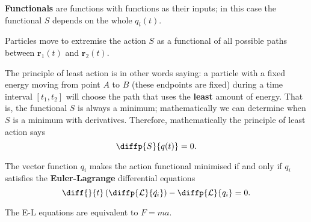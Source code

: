 \documentclass[12pt, a4paper]{article}
\begin{document}
\begin{mdnote}
    \textbf{Functionals} are functions with functions as their inputs; in this case the functional \(S\) depends on the whole \(q_i(t)\).
\end{mdnote}

\begin{mdthm}
    Particles move to extremise the action \(S\) as a functional of all possible paths between \(\bm{r}_1(t)\) and \(\bm{r}_2(t)\).
\end{mdthm}

\begin{mdnote}
    The principle of least action is in other words saying: a particle with a fixed energy moving from point \(A\) to \(B\) (these endpoints are fixed) during a time interval \([t_1,t_2]\) will choose the path that uses the \textbf{least} amount of energy. That is, the functional \(S\) is always a minimum; mathematically we can determine when \(S\) is a minimum with derivatives. Therefore, mathematically the principle of least action says
    \[\diffp{S}{{q(t)}} = 0.\]
\end{mdnote}

\begin{mdthm}
    The vector function \(q_i\) makes the action functional minimised if and only if \(q_i\) satisfies the \textbf{Euler-Lagrange} differential equations
    \[\diff{}{t}\left( \diffp{{\mathcal{L}}}{{\dot{q_i}}} \right) - \diffp{{\mathcal{L}}}{{q_i}} =0.\]
\end{mdthm}

\begin{mdnote}
    The E-L equations are equivalent to \(F =ma\).
\end{mdnote}
\end{document}
